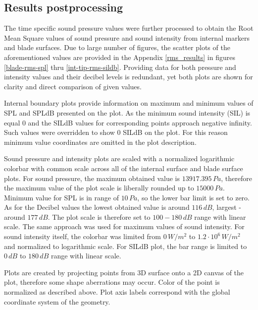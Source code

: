 \subsection{Results postprocessing} \label{rms_res_prep}
The time specific sound pressure values were further processed to obtain the Root Mean Square values of sound pressure and sound intensity from internal markers and blade surfaces. Due to large number of figures, the scatter plots of the aforementioned values are provided in the Appendix \ref{rms_results} in figures \ref{blade-rms-spl} thru \ref{int-tip-rms-sildb}. Providing data for both pressure and intensity values and their decibel levels is redundant, yet both plots are shown for clarity and direct comparison of given values. 

Internal boundary plots provide information on maximum and minimum values of SPL and SPLdB presented on the plot. As the minimum sound intensity (SIL) is equal 0 and the SILdB values for corresponding points approach negative infinity. Such values were overridden to show 0 SILdB on the plot.    For this reason minimum value coordinates are omitted in the plot description.

Sound pressure and intensity plots are scaled with a normalized logarithmic colorbar with common scale across all of the internal surface and blade surface plots. For sound pressure, the maximum obtained value is $13917.395 \, Pa$, therefore the maximum value of the plot scale is liberally rounded up to $15000 \, Pa$. Minimum value for SPL is in range of $10 \, Pa$, so the lower bar limit is set to zero. As for the Decibel values the lowest obtained value is around $116 \, dB$, largest - around $177 \, dB$. The plot scale is therefore set to \mbox{$100 - 180 \, dB$} range with linear scale. The same approach was used for maximum values of sound intensity. For sound intensity itself, the colorbar was limited from $0 \, W/m^2$ to $1.2 \cdot 10^6 \, W/m^2$ and normalized to logarithmic scale. For SILdB plot, the bar range is limited to $0 \, dB$ to $180 \, dB$ range with linear scale. %

Plots are created by projecting points from 3D surface onto a 2D canvas of the plot, therefore some shape aberrations may occur. Color of the point is normalized as described above. Plot axis labels correspond with the global coordinate system of the geometry.

